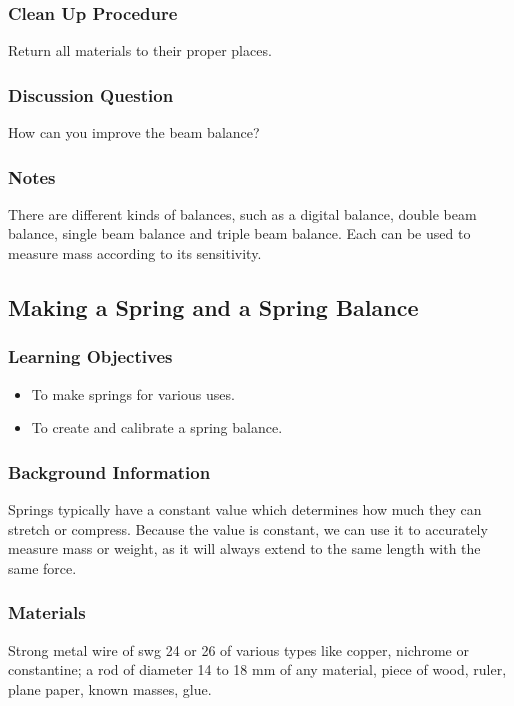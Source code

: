 \subsubsection*{Clean Up Procedure}
Return all materials to their proper places.

\subsubsection*{Discussion Question}
How can you improve the beam balance?

\subsubsection*{Notes}
There are different kinds of balances, such as a digital balance, double beam balance, single beam balance and triple beam balance. Each can be used to measure mass according to its sensitivity.

\subsection{Making a Spring and a Spring Balance}

\subsubsection*{Learning Objectives}
\begin{itemize}
\item{To make springs for various uses.}
\item{To create and calibrate a spring balance.}
\end{itemize}

\subsubsection*{Background Information}
Springs typically have a constant value which determines how much they can stretch or compress.  Because the value is constant, we can use it to accurately measure mass or weight, as it will always extend to the same length with the same force.

\subsubsection*{Materials}
Strong metal wire of swg 24 or 26 of various types like copper, nichrome or constantine; a rod of diameter 14 to 18 mm of any material, piece of wood, ruler, plane paper, known masses, glue.

